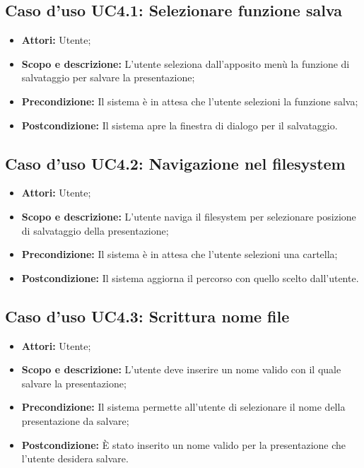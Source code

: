 \subsection{Caso d'uso UC4.1: Selezionare funzione salva}
\begin{itemize}
	\item \textbf{Attori:} Utente;
	\item \textbf{Scopo e descrizione:} L'utente seleziona dall'apposito menù la funzione di salvataggio per salvare la presentazione;
	\item \textbf{Precondizione:} Il sistema è in attesa che l'utente selezioni la funzione salva;
	\item \textbf{Postcondizione:} Il sistema apre la finestra di dialogo per il salvataggio.
\end{itemize}

\subsection{Caso d'uso UC4.2: Navigazione nel filesystem}
\begin{itemize}
	\item \textbf{Attori:} Utente;
	\item \textbf{Scopo e descrizione:} L'utente naviga il \gls{filesystem} per selezionare posizione di salvataggio della presentazione;
	\item \textbf{Precondizione:} Il sistema è in attesa che l'utente selezioni una cartella;
	\item \textbf{Postcondizione:} Il sistema aggiorna il percorso con quello scelto dall'utente.
\end{itemize}

\subsection{Caso d'uso UC4.3: Scrittura nome file}
\begin{itemize}
	\item \textbf{Attori:} Utente;
	\item \textbf{Scopo e descrizione:} L'utente deve inserire un nome valido con il quale salvare la presentazione;
	\item \textbf{Precondizione:} Il sistema permette all'utente di selezionare il nome della presentazione da salvare;
	\item \textbf{Postcondizione:} È stato inserito un nome valido per la presentazione che l'utente desidera salvare.
\end{itemize}


